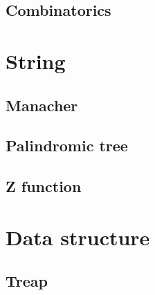 \subsection{Combinatorics}

\hrulefill

\section{String}
\subsection{Manacher}
\raggedbottom
\hrulefill
\subsection{Palindromic tree}
\raggedbottom
\hrulefill
\subsection{Z function}
\raggedbottom
\hrulefill

\section{Data structure}
\subsection{Treap}
\raggedbottom
\hrulefill

